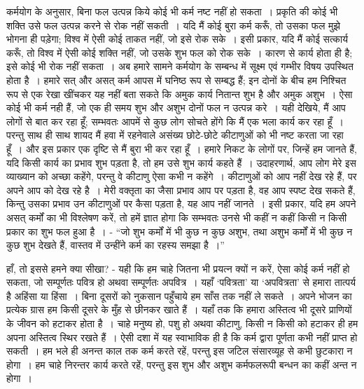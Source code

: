 कर्मयोग के अनुसार, बिना फल उत्पन्न किये कोई भी कर्म नष्ट नहीं हो सकता~। प्रकृति की कोई भी शक्ति उसे फल उत्पन्न करने से रोक नहीं सकती~। यदि मैं कोई बुरा कर्म करूँ, तो उसका फल मुझे भोगना ही पड़ेगा; विश्व में ऐसी कोई ताकत नहीं, जो इसे रोक सके~। इसी प्रकार, यदि मैं कोई सत्कार्य करूँ, तो विश्व में ऐसी कोई शक्ति नहीं, जो उसके शुभ फल को रोक सके~। कारण से कार्य होता ही है; इसे कोई भी रोक नहीं सकता~। अब हमारे सामने कर्मयोग के सम्बन्ध में सूक्ष्म एवं गम्भीर विषय उपस्थित होता है~। हमारे सत् और असत् कर्म आपस में घनिष्ठ रूप से सम्बद्ध हैं; इन दोनों के बीच हम निश्चित रूप से एक रेखा खींचकर यह नहीं बता सकते कि अमुक कार्य नितान्त शुभ है और अमुक अशुभ~। ऐसा कोई भी कर्म नही हैं, जो एक ही समय शुभ और अशुभ दोनों फल न उत्पन्न करे~। यही देखिये, मैं आप लोगों से बात कर रहा हूँ; सम्भवतः आपमें से कुछ लोग सोचते होंगे कि मैं एक भला कार्य कर रहा हूँ~। परन्तु साथ ही साथ शायद मैं हवा में रहनेवाले असंख्य छोटे-छोटे कीटाणुओं को भी नष्ट करता जा रहा हूँ~। और इस प्रकार एक दृष्टि से मैं बुरा भी कर रहा हूँ~। हमारे निकट के लोगों पर, जिन्हें हम जानते हैं, यदि किसी कार्य का प्रभाव शुभ पड़ता है, तो हम उसे शुभ कार्य कहते हैं~। उदाहरणार्थ, आप लोग मेरे इस व्याख्यान को अच्छा कहेंगे, परन्तु वे कीटाणु ऐसा कभी न कहेंगे~। कीटाणुओं को आप नहीं देख रहे हैं, पर अपने आप को देख रहे है~। मेरी वक्तृता का जैसा प्रभाव आप पर पड़ता है, वह आप स्पष्ट देख सकते हैं, किन्तु उसका प्रभाव उन कीटाणुओं पर कैसा पड़ता है, यह आप नहीं जानते~। इसी प्रकार, यदि हम अपने असत् कर्मों का भी विश्लेषण करें, तो हमें ज्ञात होगा कि सम्भवतः उनसे भी कहीं न कहीं किसी न किसी प्रकार का शुभ फल हुआ है~। - “जो शुभ कर्मों में भी कुछ न कुछ अशुभ, तथा अशुभ कर्मों में भी कुछ न कुछ शुभ देखते हैं, वास्तव में उन्हींने कर्म का रहस्य समझा है~।”

\newpage

हाँ, तो इससे हमने क्या सीखा? - यही कि हम चाहे जितना भी प्रयत्न क्यों न करें, ऐसा कोई कर्म नहीं हो सकता, जो सम्पूर्णतः पवित्र हो अथवा सम्पूर्णतः अपवित्र~। यहाँ ‘पवित्रता’ या ‘अपवित्रता’ से हमारा तात्पर्य है अहिंसा या हिंसा~। बिना दूसरों को नुकसान पहुँचाये हम साँस तक नहीं ले सकते~। अपने भोजन का प्रत्येक ग्रास हम किसी दूसरे के मुँह से छीनकर खाते हैं~। यहाँ तक कि हमारा अस्तित्व भी दूसरे प्राणियों के जीवन को हटाकर होता है~। चाहे मनुष्य हो, पशु हो अथवा कीटाणु, किसी न किसी को हटाकर ही हम अपना अस्तित्व स्थिर रखते हैं~। ऐसी दशा में यह स्वाभाविक ही है कि कर्म द्वारा पूर्णता कभी नहीं प्राप्त हो सकती~। हम भले ही अनन्त काल तक कर्म करते रहें, परन्तु इस जटिल संसारव्यूह से कभी छुटकारा न होगा~। हम चाहे निरन्तर कार्य करते रहें, परन्तु इस शुभ और अशुभ कर्मफलरूपी बन्धन का कहीं अन्त न होगा~।

